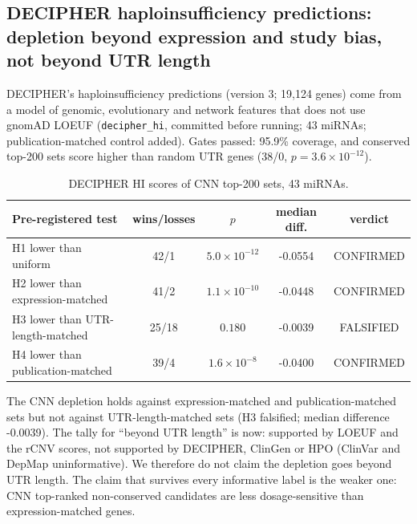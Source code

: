 \subsection{DECIPHER haploinsufficiency predictions: depletion beyond expression and study bias, not beyond UTR length}
DECIPHER's haploinsufficiency predictions (version 3; 19,124 genes) come from a model of genomic, evolutionary and network features that does not use gnomAD LOEUF (\texttt{decipher\_hi}, committed before running; 43 miRNAs; publication-matched control added). Gates passed: 95.9\% coverage, and conserved top-200 sets score higher than random UTR genes (38/0, $p=3.6\times10^{-12}$).
\begin{table}[h]\centering\small\begin{tabular}{lcccc}\hline Pre-registered test & wins/losses & $p$ & median diff. & verdict\\\hline
H1 lower than uniform & 42/1 & $5.0\times10^{-12}$ & -0.0554 & CONFIRMED \\
H2 lower than expression-matched & 41/2 & $1.1\times10^{-10}$ & -0.0448 & CONFIRMED \\
H3 lower than UTR-length-matched & 25/18 & $0.180$ & -0.0039 & FALSIFIED \\
H4 lower than publication-matched & 39/4 & $1.6\times10^{-8}$ & -0.0400 & CONFIRMED \\
\hline\end{tabular}\caption{DECIPHER HI scores of CNN top-200 sets, 43 miRNAs.}\label{tab:decipher}\end{table}
The CNN depletion holds against expression-matched and publication-matched sets but not against UTR-length-matched sets (H3 falsified; median difference -0.0039). The tally for ``beyond UTR length'' is now: supported by LOEUF and the rCNV scores, not supported by DECIPHER, ClinGen or HPO (ClinVar and DepMap uninformative). We therefore do not claim the depletion goes beyond UTR length. The claim that survives every informative label is the weaker one: CNN top-ranked non-conserved candidates are less dosage-sensitive than expression-matched genes.
